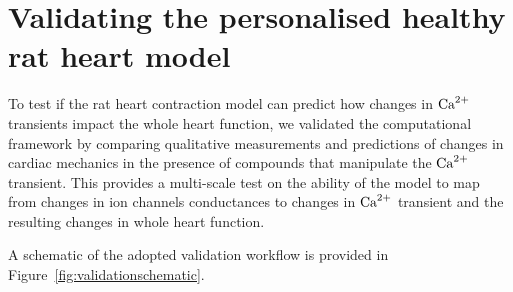 %
%
%
\section{Validating the personalised healthy rat heart model}\label{sec:ch6validating_the_personalised_healthy_rat_heart_model}
To test if the rat heart contraction model can predict how changes in $\textrm{Ca}^{2+}$ transients impact the whole heart function, we validated the computational framework by comparing qualitative measurements and predictions of changes in cardiac mechanics in the presence of compounds that manipulate the $\textrm{Ca}^{2+}$ transient. This provides a multi-scale test on the ability of the model to map from changes in ion channels conductances to changes in $\textrm{Ca}^{2+}$ transient and the resulting changes in whole heart function.

\vspace{0.2cm}\noindent
A schematic of the adopted validation workflow is provided in Figure~\ref{fig:validationschematic}.

